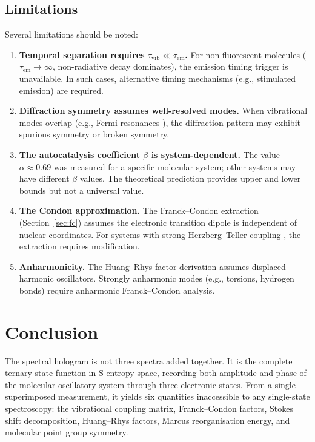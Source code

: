 \documentclass[11pt,twocolumn,a4paper]{article}
\theoremstyle{definition}
\theoremstyle{remark}
\begin{document}
\subsection{Limitations}

Several limitations should be noted:

\begin{enumerate}[label=(\roman*)]
  \item \textbf{Temporal separation requires $\tau_{\mathrm{vib}} \ll \tau_{\mathrm{em}}$.} For non-fluorescent molecules ($\tau_{\mathrm{em}} \to \infty$, non-radiative decay dominates), the emission timing trigger is unavailable. In such cases, alternative timing mechanisms (e.g., stimulated emission) are required.
  \item \textbf{Diffraction symmetry assumes well-resolved modes.} When vibrational modes overlap (e.g., Fermi resonances \citep{fermi1931}), the diffraction pattern may exhibit spurious symmetry or broken symmetry.
  \item \textbf{The autocatalysis coefficient $\beta$ is system-dependent.} The value $\alpha \approx 0.69$ was measured for a specific molecular system; other systems may have different $\beta$ values. The theoretical prediction provides upper and lower bounds but not a universal value.
  \item \textbf{The Condon approximation.} The Franck--Condon extraction (Section~\ref{sec:fc}) assumes the electronic transition dipole is independent of nuclear coordinates. For systems with strong Herzberg--Teller coupling \citep{duschinsky1937}, the extraction requires modification.
  \item \textbf{Anharmonicity.} The Huang--Rhys factor derivation assumes displaced harmonic oscillators. Strongly anharmonic modes (e.g., torsions, hydrogen bonds) require anharmonic Franck--Condon analysis.
\end{enumerate}

\section{Conclusion}
\label{sec:conclusion}

The spectral hologram is not three spectra added together. It is the complete ternary state function in S-entropy space, recording both amplitude and phase of the molecular oscillatory system through three electronic states. From a single superimposed measurement, it yields six quantities inaccessible to any single-state spectroscopy: the vibrational coupling matrix, Franck--Condon factors, Stokes shift decomposition, Huang--Rhys factors, Marcus reorganisation energy, and molecular point group symmetry.
\end{document}
